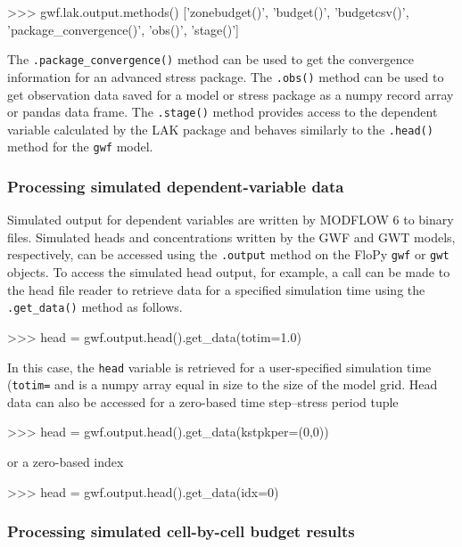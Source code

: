 \documentclass[12pt, oneside]{article}  	%
\begin{document}
\begin{python}
>>> gwf.lak.output.methods()
['zonebudget()', 'budget()', 'budgetcsv()', 'package_convergence()', 'obs()', 
 'stage()']
\end{python}

\noindent The \texttt{.package\_convergence()} method can be used to get the convergence information for an advanced stress package. The \texttt{.obs()} method can be used to get observation data saved for a model or stress package as a numpy record array or pandas data frame. The \texttt{.stage()} method provides access to the dependent variable calculated by the LAK package and behaves similarly to the \texttt{.head()} method for the \texttt{gwf} model. 

\subsubsection*{Processing simulated dependent-variable data}

Simulated output for dependent variables are written by MODFLOW 6 to binary files. Simulated heads and concentrations written by the GWF and GWT models, respectively, can be accessed using the \texttt{.output} method on the FloPy \texttt{gwf} or \texttt{gwt} objects. To access the simulated head output, for example, a call can be made to the head file reader to retrieve data for a specified simulation time using the \texttt{.get\_data()} method as follows.

\begin{python}
>>> head = gwf.output.head().get_data(totim=1.0)
\end{python}

\noindent In this case, the \texttt{head} variable is retrieved for a user-specified simulation time (\texttt{totim=} and is a numpy array equal in size to the size of the model grid. Head data can also be accessed for a zero-based time step--stress period tuple

\begin{python}
>>> head = gwf.output.head().get_data(kstpkper=(0,0))
\end{python}

\noindent or a zero-based index

\begin{python}
>>> head = gwf.output.head().get_data(idx=0)
\end{python}

\subsubsection*{Processing simulated cell-by-cell budget results}
\end{document}
